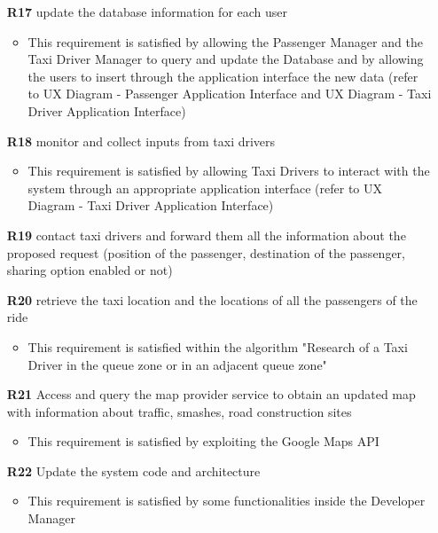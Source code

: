 \begin{itemize}
	\item [\textbf{R17}] update the database information for each user
	\begin{itemize}
		\item This requirement is satisfied by allowing the Passenger Manager and the Taxi Driver Manager to query and update the Database and by allowing the users to insert through the application interface the new data (refer to UX Diagram - Passenger Application Interface and UX Diagram - Taxi Driver Application Interface)
	\end{itemize}

	\item [\textbf{R18}] monitor and collect inputs from taxi drivers
	\begin{itemize}
		\item This requirement is satisfied by allowing Taxi Drivers to interact with the system through an appropriate application interface (refer to UX Diagram - Taxi Driver Application Interface)
	\end{itemize}

	\item [\textbf{R19}] contact taxi drivers and forward them all the information about the proposed request (position of the passenger, destination of the passenger, sharing option enabled or not)
	\item [\textbf{R20}] retrieve the taxi location and the locations of all the passengers of the ride
	\begin{itemize}
		\item This requirement is satisfied within the algorithm "Research of a Taxi Driver in the queue zone or in an adjacent queue zone"
	\end{itemize}
	
	\item [\textbf{R21}] Access and query the map provider service to obtain an updated map with information about traffic, smashes, road construction sites
	\begin{itemize}
		\item This requirement is satisfied by exploiting the Google Maps API
	\end{itemize}
	
	\item [\textbf{R22}] Update the system code and architecture
	\begin{itemize}
		\item This requirement is satisfied by some functionalities inside the Developer Manager
	\end{itemize}
\end{itemize}